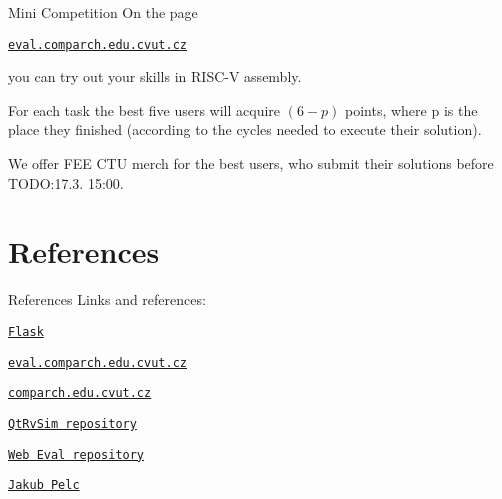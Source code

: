 \documentclass{beamer}
\begin{document}
	\begin{frame}{Mini Competition}
		On the page \par
		{\centering \texttt{\href{http://eval.comparch.edu.cvut.cz}{eval.comparch.edu.cvut.cz}} \par}
		you can try out your skills in RISC-V assembly. \par

		For each task the best five users will acquire $(6 - p)$ points, where p is the place they finished (according to the cycles needed to execute their solution). \par

		We offer FEE CTU merch for the best users, who submit their solutions before TODO:17.3. 15:00. \par
	\end{frame}

	\section{References}

	\begin{frame}{References}
		Links and references: \par
		{\centering \texttt{\href{https://flask.palletsprojects.com/en/3.0.x/}{Flask}} \par}
		{\centering \texttt{\href{http://eval.comparch.edu.cvut.cz}{eval.comparch.edu.cvut.cz}} \par}
		{\centering \texttt{\href{http://comparch.edu.cvut.cz}{comparch.edu.cvut.cz}} \par}
		{\centering \texttt{\href{https://github.com/cvut/qtrvsim}{QtRvSim repository}} \par}
		{\centering \texttt{\href{https://gitlab.fel.cvut.cz/b35apo/qtrvsim-eval-web}{Web Eval repository}} \par}
		{\centering \texttt{\href{https://swpelc.eu}{Jakub Pelc}} \par}
	\end{frame}
\end{document}

